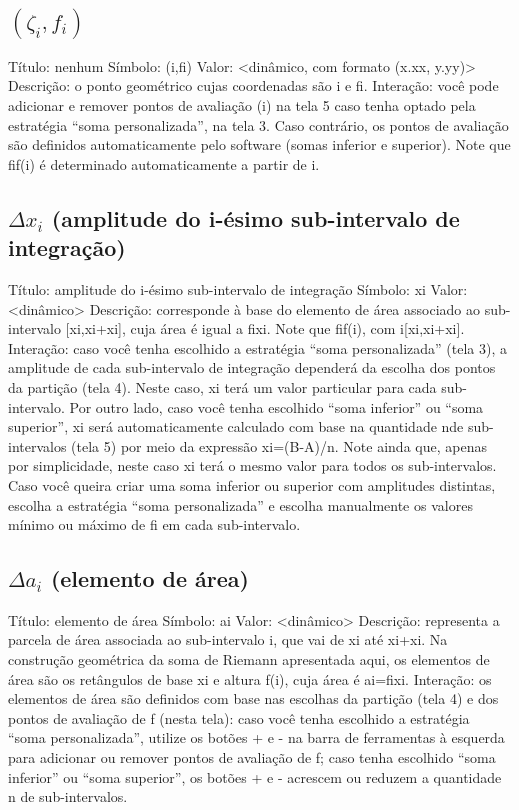 \documentclass[a4paper,10pt]{scrartcl}
\begin{document}
  \subsection*{$(\zeta_i,f_i)$}
	Título: nenhum
	Símbolo: (i,fi)
	Valor: <dinâmico, com formato (x.xx, y.yy)>
	Descrição: o ponto geométrico cujas coordenadas são i e fi.
	Interação: você pode adicionar e remover pontos de avaliação (i) na tela 5 caso tenha optado pela estratégia “soma personalizada”, na tela 3. Caso contrário, os pontos de avaliação são definidos automaticamente pelo software (somas inferior e superior). Note que fif(i) é determinado automaticamente a partir de i.

  \subsection*{$\Delta x_i$ (amplitude do i-ésimo sub-intervalo de integração)}
	Título: amplitude do i-ésimo sub-intervalo de integração
	Símbolo: xi
	Valor: <dinâmico>
	Descrição: corresponde à base do elemento de área associado ao sub-intervalo [xi,xi+xi], cuja área é igual a fixi. Note que fif(i), com i[xi,xi+xi].
	Interação: caso você tenha escolhido a estratégia “soma personalizada” (tela 3), a amplitude de cada sub-intervalo de integração dependerá da escolha dos pontos da partição (tela 4). Neste caso, xi terá um valor particular para cada sub-intervalo. Por outro lado, caso você tenha escolhido “soma inferior” ou “soma superior”, xi será automaticamente calculado com base na quantidade nde sub-intervalos (tela 5) por meio da expressão xi=(B-A)/n. Note ainda que, apenas por simplicidade, neste caso xi terá o mesmo valor para todos os sub-intervalos. Caso você queira criar uma soma inferior ou superior com amplitudes distintas, escolha a estratégia “soma personalizada” e escolha manualmente os valores mínimo ou máximo de fi em cada sub-intervalo.

  \subsection*{$\Delta a_i$ (elemento de área)}
	Título: elemento de área
	Símbolo: ai
	Valor: <dinâmico>
	Descrição: representa a parcela de área associada ao sub-intervalo i, que vai de xi até xi+xi. Na construção geométrica da soma de Riemann apresentada aqui, os elementos de área são os retângulos de base xi e altura f(i), cuja área é ai=fixi.
	Interação: os elementos de área são definidos com base nas escolhas da partição (tela 4) e dos pontos de avaliação de f (nesta tela): caso você tenha escolhido a estratégia “soma personalizada”, utilize os botões + e - na barra de ferramentas à esquerda para adicionar ou remover pontos de avaliação de f; caso tenha escolhido “soma inferior” ou “soma superior”, os botões + e - acrescem ou reduzem a quantidade n de sub-intervalos.
\end{document}
